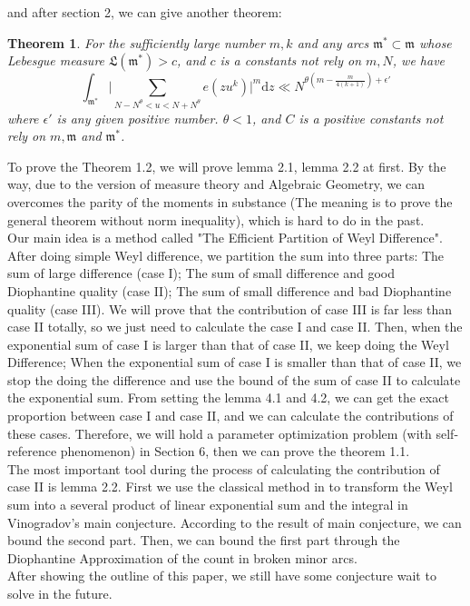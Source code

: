 \documentclass[10pt]{article}
\newtheorem{theorem}{Theorem}[section]
\begin{document}
and after section 2, we can give another theorem:
\begin{theorem}
For the sufficiently large number $m,k$ and any arcs $\mathfrak{m^*}\subset\mathfrak{m}$ whose Lebesgue measure $\mathfrak{L}(\mathfrak{m^*})>c$, and $c$ is a constants not rely on $m,N$, we have
\[
\int_{\mathfrak{m^*}}\bigg|\sum\limits_{{N-N^\theta}<u<{N+N^\theta}}{e(zu^k)}\bigg|^{m}\mathrm{d}z\ll N^{\theta(m-\frac{m}{4(k+1)})+\epsilon'}
\]
where $\epsilon'$ is any given positive number. $\theta<1$, and $C$ is a positive constants not rely on $m,\mathfrak{m}$ and $\mathfrak{m^*}$.
\end{theorem}
To prove the Theorem 1.2, we will prove lemma 2.1, lemma 2.2 at first. By the way, due to the version of measure theory and Algebraic Geometry, we can overcomes the parity of the moments in substance (The meaning is to prove the general theorem without norm inequality), which is hard to do in the past.\\
Our main idea is a method called "The Efficient Partition of Weyl Difference". After doing simple Weyl difference, we partition the sum into three parts: The sum of large difference (case I); The sum of small difference and good Diophantine quality (case II); The sum of small difference and bad Diophantine quality (case III). We will prove that the contribution of case III is far less than case II totally, so we just need to calculate the case I and case II. Then, when the exponential sum of case I is larger than that of case II, we keep doing the Weyl Difference; When the exponential sum of case I is smaller than that of case II, we stop the doing the difference and use the bound of the sum of case II to calculate the exponential sum. From setting the lemma 4.1 and 4.2, we can get the exact proportion between case I and case II, and we can calculate the contributions of these cases. Therefore, we will hold a parameter optimization problem (with self-reference phenomenon) in Section 6, then we can prove the theorem 1.1.\\
The most important tool during the process of calculating the contribution of case II is lemma 2.2. First we use the classical method in \cite{PP1986} to transform the Weyl sum into a several product of linear exponential sum and the integral in Vinogradov's main conjecture. According to the result of main conjecture, we can bound the second part. Then, we can bound the first part through the Diophantine Approximation of the count in broken minor arcs.\\
After showing the outline of this paper, we still have some conjecture wait to solve in the future.
\end{document}
